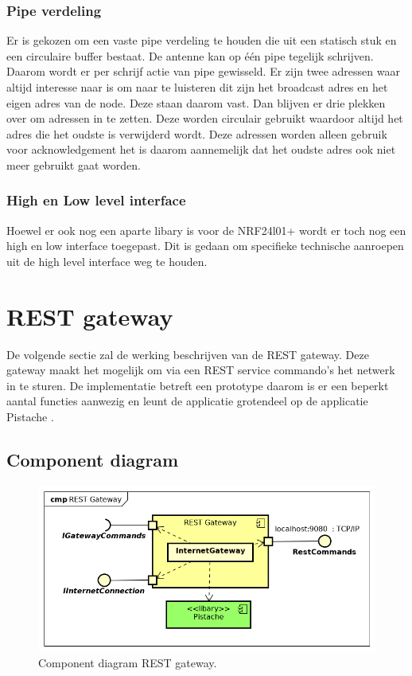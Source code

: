 \documentclass[a4paper, 11pt, oneside]{report}
\begin{document}
\subsubsection{Pipe verdeling}
Er is gekozen om een vaste pipe verdeling te houden die uit een statisch stuk en een circulaire buffer bestaat.
De antenne kan op één pipe tegelijk schrijven. 
Daarom wordt er per schrijf actie van pipe gewisseld.
Er zijn twee adressen waar altijd interesse naar is om naar te luisteren dit zijn het broadcast adres en het eigen adres van de node.
Deze staan daarom vast. 
Dan blijven er drie plekken over om adressen in te zetten. 
Deze worden circulair gebruikt waardoor altijd het adres die het oudste is verwijderd wordt.
Deze adressen worden alleen gebruik voor acknowledgement het is daarom aannemelijk dat het oudste adres ook niet meer gebruikt gaat worden.

\subsubsection{High en Low level interface}
Hoewel er ook nog een aparte libary is voor de NRF24l01+ wordt er toch nog een high en low interface toegepast. 
Dit is gedaan om specifieke technische aanroepen uit de high level interface weg te houden.


\section{REST gateway}
\label{DetailedDesign:RESTgateway}
De volgende sectie zal de werking beschrijven van de REST gateway. 
Deze gateway maakt het mogelijk om via een REST service commando's het netwerk in te sturen. 
De implementatie betreft een prototype daarom is er een beperkt aantal functies aanwezig en leunt de applicatie grotendeel op de applicatie Pistache \cite{pisrest}.

\subsection{Component diagram}
\label{DetailedDesign:RESTgateway:component}

\begin{figure}[H]
	\begin{center}\includegraphics[width=.6\linewidth]{Afbeeldingen/RESTgatewayComponentDiagram.png}\end{center}
	\caption{Component diagram REST gateway.}
	\label{fig:component:RESTgateway}
\end{figure}
\end{document}
